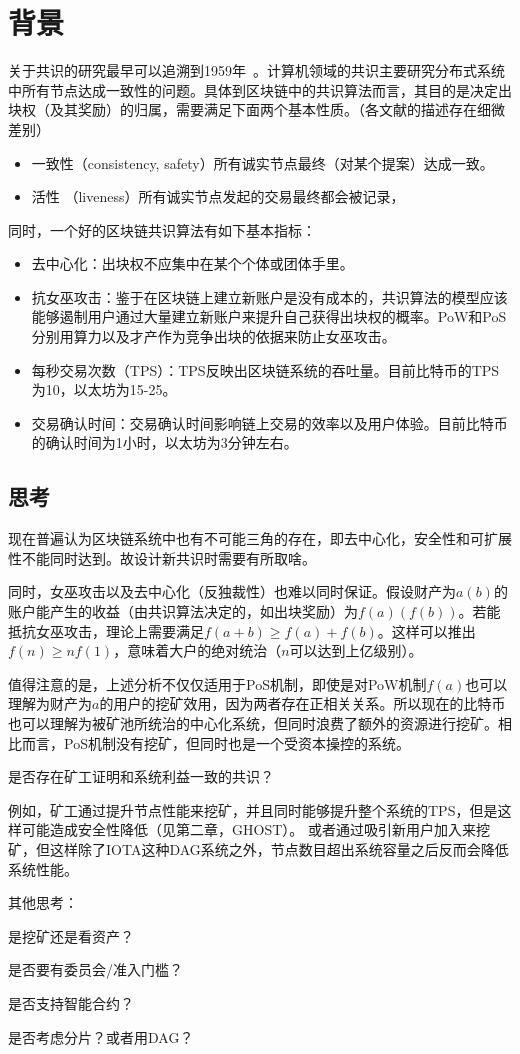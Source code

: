 \section{背景}
关于共识的研究最早可以追溯到1959年~\cite{eisenberg1959consensus}。计算机领域的共识主要研究分布式系统中所有节点达成一致性的问题。具体到区块链中的共识算法而言，其目的是决定出块权（及其奖励）的归属，需要满足下面两个基本性质。（各文献的描述存在细微差别）

\begin{itemize}
\item 一致性（consistency, safety）所有诚实节点最终（对某个提案）达成一致。
\item 活性 （liveness）所有诚实节点发起的交易最终都会被记录，
\end{itemize}
同时，一个好的区块链共识算法有如下基本指标：
\begin{itemize}
\item 去中心化：出块权不应集中在某个个体或团体手里。
\item 抗女巫攻击：鉴于在区块链上建立新账户是没有成本的，共识算法的模型应该能够遏制用户通过大量建立新账户来提升自己获得出块权的概率。PoW和PoS分别用算力以及才产作为竞争出块的依据来防止女巫攻击。
\item 每秒交易次数（TPS）：TPS反映出区块链系统的吞吐量。目前比特币的TPS为10，以太坊为15-25。
\item 交易确认时间：交易确认时间影响链上交易的效率以及用户体验。目前比特币的确认时间为1小时，以太坊为3分钟左右。
\end{itemize}

\subsection{思考}
现在普遍认为区块链系统中也有不可能三角的存在，即去中心化，安全性和可扩展性不能同时达到。故设计新共识时需要有所取啥。

同时，女巫攻击以及去中心化（反独裁性）也难以同时保证。假设财产为$a(b)$的账户能产生的收益（由共识算法决定的，如出块奖励）为$f(a)(f(b))$。若能抵抗女巫攻击，理论上需要满足$f(a+b)\geq f(a)+f(b)$。这样可以推出$f(n)\geq nf(1)$，意味着大户的绝对统治（$n$可以达到上亿级别）。

值得注意的是，上述分析不仅仅适用于PoS机制，即使是对PoW机制$f(a)$也可以理解为财产为$a$的用户的挖矿效用，因为两者存在正相关关系。所以现在的比特币也可以理解为被矿池所统治的中心化系统，但同时浪费了额外的资源进行挖矿。相比而言，PoS机制没有挖矿，但同时也是一个受资本操控的系统。

{\color{red}是否存在矿工证明和系统利益一致的共识？}

例如，矿工通过提升节点性能来挖矿，并且同时能够提升整个系统的TPS，但是这样可能造成安全性降低（见第二章，GHOST）。 或者通过吸引新用户加入来挖矿，但这样除了IOTA这种DAG系统之外，节点数目超出系统容量之后反而会降低系统性能。

其他思考：

是挖矿还是看资产？

是否要有委员会/准入门槛？

是否支持智能合约？

是否考虑分片？或者用DAG？

